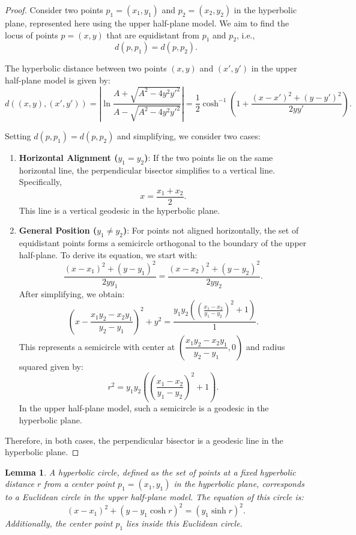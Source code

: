 \documentclass[minted, draw]{hebdomon}
\newtheorem{lemma}{Lemma}
\begin{document}
\begin{proof}
    Consider two points $p_1 = (x_1, y_1)$ and $p_2 = (x_2, y_2)$ in the hyperbolic plane, represented here using the upper half-plane model. We aim to find the locus of points $p = (x, y)$ that are equidistant from $p_1$ and $p_2$, i.e., 
    \[
        d(p, p_1) = d(p, p_2).
    \]
    
    The hyperbolic distance between two points $(x, y)$ and $(x', y')$ in the upper half-plane model is given by:
    \[
        d\left((x, y), (x', y')\right) =\left |  \ln \dfrac{A + \sqrt{A^2 - 4y^2y'^2}}{A - \sqrt{A^2 - 4y^2y'^2}} \right | = \frac{1}{2}\cosh^{-1}\left(1 + \frac{(x - x')^2 + (y - y')^2}{2 y y'}\right).
    \]
    
    Setting $d(p, p_1) = d(p, p_2)$ and simplifying, we consider two cases:

    \begin{enumerate}
        \item \textbf{Horizontal Alignment ($y_1 = y_2$)}: If the two points lie on the same horizontal line, the perpendicular bisector simplifies to a vertical line. Specifically, 
        \[
            x = \frac{x_1 + x_2}{2}.
        \]
        This line is a vertical geodesic in the hyperbolic plane.

        \item \textbf{General Position ($y_1 \neq y_2$)}: For points not aligned horizontally, the set of equidistant points forms a semicircle orthogonal to the boundary of the upper half-plane. To derive its equation, we start with:
        \[
            \frac{(x - x_1)^2 + (y - y_1)^2}{2 y y_1} = \frac{(x - x_2)^2 + (y - y_2)^2}{2 y y_2}.
        \]
        After simplifying, we obtain:
        \[
            \left(x - \frac{x_1 y_2 - x_2 y_1}{y_2 - y_1}\right)^2 + y^2 = \frac{y_1 y_2 \left(\left(\frac{x_1 - x_2}{y_1 - y_2}\right)^2 + 1\right)}{1}.
        \]
        This represents a semicircle with center at $\left(\dfrac{x_1 y_2 - x_2 y_1}{y_2 - y_1}, 0\right)$ and radius squared given by:
        \[
            r^2 = y_1 y_2 \left(\left(\frac{x_1 - x_2}{y_1 - y_2}\right)^2 + 1\right).
        \]
        In the upper half-plane model, such a semicircle is a geodesic in the hyperbolic plane.
    \end{enumerate}
    
    Therefore, in both cases, the perpendicular bisector is a geodesic line in the hyperbolic plane. 
\end{proof}

\begin{lemma}
    A hyperbolic circle, defined as the set of points at a fixed hyperbolic distance $r$ from a center point $p_1 = (x_1, y_1)$ in the hyperbolic plane, corresponds to a Euclidean circle in the upper half-plane model. The equation of this circle is:
    \[
        (x - x_1)^2 + \left(y - y_1 \cosh r\right)^2 = \left(y_1 \sinh r\right)^2.
    \]
    Additionally, the center point $p_1$ lies inside this Euclidean circle.
\end{lemma}
\end{document}
